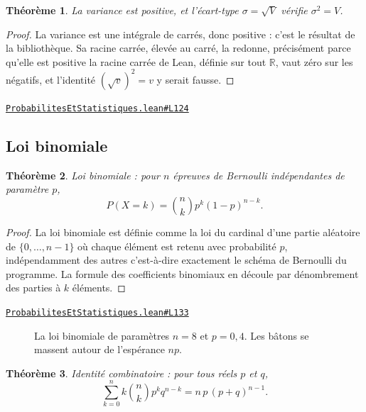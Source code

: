 \documentclass[11pt,a4paper]{article}
\theoremstyle{definition}
\theoremstyle{plain}
\newtheorem{theoreme}{Théorème}
\newcommand{\source}[2]{\par\smallskip\noindent\hfill{\footnotesize\href{#1}{\texttt{#2}}}\par\smallskip}
\begin{document}
\begin{theoreme}
La variance est positive, et l'écart-type $\sigma = \sqrt{V}$ vérifie $\sigma^{2} = V$.
\end{theoreme}

\begin{proof}
La variance est une intégrale de carrés, donc positive : c'est le résultat de la
bibliothèque. Sa racine carrée, élevée au carré, la redonne, précisément parce qu'elle est
positive \textemdash{} la racine carrée de Lean, définie sur tout $\mathbb{R}$, vaut zéro
sur les négatifs, et l'identité $(\sqrt{v})^{2} = v$ y serait fausse.
\end{proof}
\source{https://github.com/Commutator-IO/learn-lean/blob/main/courses/02-lycee/09-probabilites-et-statistiques/ProbabilitesEtStatistiques.lean\#L124}{ProbabilitesEtStatistiques.lean\#L124}

\subsection{Loi binomiale}

\begin{theoreme}
Loi binomiale : pour $n$ épreuves de Bernoulli indépendantes de paramètre $p$,
\[ P(X = k) = \binom{n}{k} p^{k} (1-p)^{n-k} . \]
\end{theoreme}

\begin{proof}
La loi binomiale est définie comme la loi du cardinal d'une partie aléatoire de $\{0, \dots, n-1\}$ où chaque élément est retenu avec probabilité
$p$, indépendamment des autres \textemdash{} c'est-à-dire exactement le schéma de Bernoulli
du programme. La formule des coefficients binomiaux en découle par dénombrement des parties
à $k$ éléments.
\end{proof}
\source{https://github.com/Commutator-IO/learn-lean/blob/main/courses/02-lycee/09-probabilites-et-statistiques/ProbabilitesEtStatistiques.lean\#L133}{ProbabilitesEtStatistiques.lean\#L133}

\begin{figure}[h]
\centering

\caption{La loi binomiale de paramètres $n = 8$ et $p = 0{,}4$. Les bâtons se massent autour de l'espérance $np$.}
\end{figure}

\begin{theoreme}
Identité combinatoire : pour tous réels $p$ et $q$,
\[ \sum_{k=0}^{n} k \binom{n}{k} p^{k} q^{n-k} = n\,p\,(p + q)^{n-1} . \]
\end{theoreme}
\end{document}
